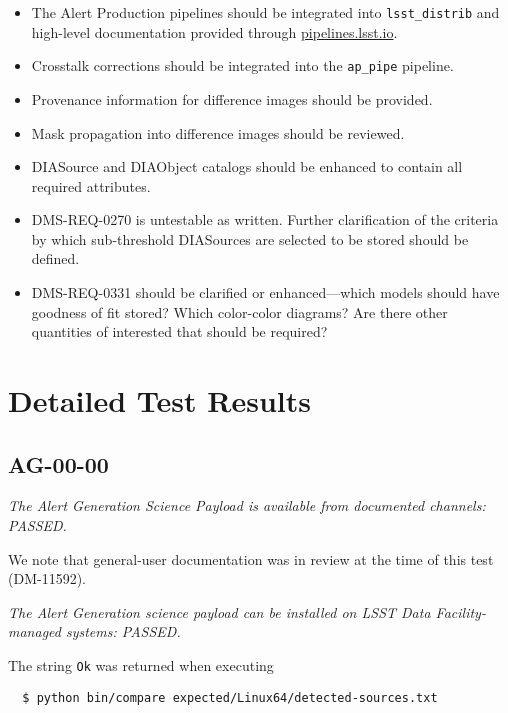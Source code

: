 \documentclass[DM,lsstdraft,STR,toc]{lsstdoc}
\begin{document}
\begin{itemize}

	\item{The Alert Production pipelines should be integrated into \texttt{lsst\_distrib} and high-level documentation provided through \url{pipelines.lsst.io}.}

	\item{Crosstalk corrections should be integrated into the \texttt{ap\_pipe} pipeline.}
	\item{Provenance information for difference images should be provided.}
	\item{Mask propagation into difference images should be reviewed.}
	\item{DIASource and DIAObject catalogs should be enhanced to contain all required attributes.}
	\item{DMS-REQ-0270 is untestable as written.  
		Further clarification of the criteria by which sub-threshold 
		DIASources are selected to be stored should be defined.}
	\item{DMS-REQ-0331 should be clarified or enhanced---which models should have goodness of fit stored?  Which color-color diagrams?  Are there other quantities of interested that should be required?}

\end{itemize}

\section{Detailed Test Results}
\label{sect:detailed}

\subsection{AG-00-00}

\textit{The Alert Generation Science Payload is available from documented channels: PASSED.}

We note that general-user documentation was in review at the time of this test (DM-11592).

\textit{The Alert Generation science payload can be installed on LSST Data Facility-managed systems: PASSED.}

The string \texttt{Ok} was returned when executing

\begin{verbatim}
  $ python bin/compare expected/Linux64/detected-sources.txt
\end{verbatim}
\end{document}
